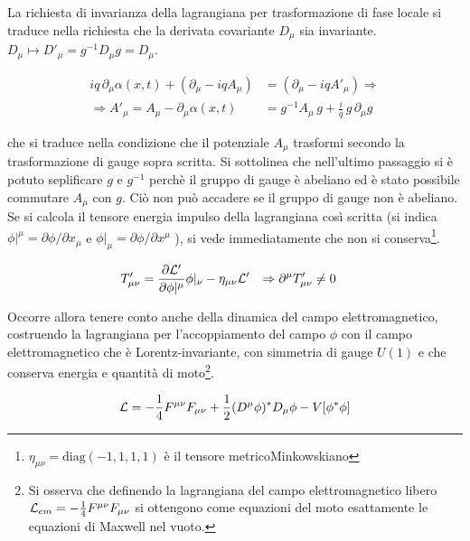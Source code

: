 La richiesta di invarianza della lagrangiana per trasformazione
di fase locale si traduce nella richiesta che la derivata covariante $D _\mu$
sia invariante. $D _\mu \mapsto D' _\mu = g^{-1} D _\mu g = D _\mu $.

\begin{equation}
   \begin{aligned}
      iq \, \partial _\mu \alpha(x,t) + (\partial _\mu - iq A _\mu)
         & = (\partial _\mu -iq A' _\mu) \Rightarrow \\
      \Rightarrow A' _\mu = A _\mu - \partial _\mu  \alpha(x,t)
         & = g ^{-1} A _\mu \, g + \frac{i}{q} \, g \, \partial _\mu g
   \end{aligned}
\end{equation}

che si traduce nella condizione che il potenziale $A _\mu$ trasformi secondo la
trasformazione di gauge sopra scritta.
Si sottolinea che nell'ultimo passaggio si è potuto seplificare $g$ e $ g^{-1} $
perchè il gruppo di gauge è abeliano ed è stato possibile commutare $ A _\mu $
con $g$. Ciò non può accadere se il gruppo di gauge non è abeliano.  \\

Se si calcola il tensore energia impulso della lagrangiana così scritta (si indica
$\phi| ^{\mu} = \partial \phi / \partial x_\mu$ e
$\phi| _{\mu} = \partial \phi / \partial x^\mu$ ), si vede immediatamente che non si
conserva\footnote{
   $\eta _{\mu\nu} = \mathrm{diag}(-1,1,1,1)$ è il tensore metricoMinkowskiano
}.

\begin{equation}
   \begin{aligned}
      T'_{\mu\nu} & = \frac{\partial \mathcal{L}'}{\partial \phi|^{\mu}}\phi|_{\nu}
      - \eta _{\mu\nu} \mathcal{L}' &
      \Rightarrow \partial ^\mu T'_{\mu\nu} & \neq 0
   \end{aligned}
\end{equation}

Occorre allora tenere conto anche della dinamica del campo elettromagnetico, costruendo
la lagrangiana per l'accoppiamento del campo $\phi$ con il campo elettromagnetico
che è Lorentz-invariante, con simmetria di gauge $U(1)$ e che conserva energia e
quantità di moto\footnote{
   Si osserva che definendo la lagrangiana del campo elettromagnetico libero
   $
      \mathcal{L} _{em} = - \frac{1}{4}F^{\mu\nu} F_{\mu\nu}
   $
   si ottengono come equazioni del moto esattamente le equazioni di Maxwell nel vuoto.
}.

\begin{equation}
\mathcal{L} = -\frac{1}{4} F^{\mu\nu}F_{\mu\nu}
+ \frac{1}{2} (D^\mu \phi)^* D _\mu \phi - V[\phi^* \phi]
\end{equation}

